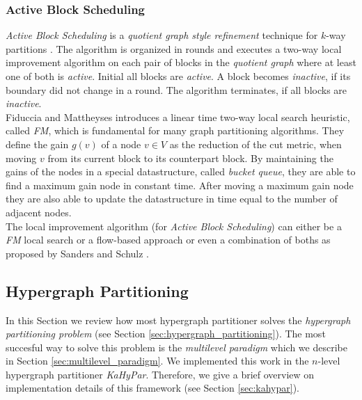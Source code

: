 \subsubsection{Active Block Scheduling}
\label{sec:abs}
\emph{Active Block Scheduling} is a \emph{quotient graph style refinement} technique for
$k$-way partitions \cite{holtgrewe2010engineering,sanders2011engineering}. 
The algorithm is organized in rounds and executes a two-way 
local improvement algorithm on each pair of 
blocks in the \emph{quotient graph} where at least one of both is \emph{active}. 
Initial all blocks are \emph{active}. A block becomes \emph{inactive}, 
if its boundary did not change in a round. The algorithm
terminates, if all blocks are \emph{inactive}. \\
Fiduccia and Mattheyses \cite{fiduccia1988linear} introduces a linear time
two-way local search heuristic, called \emph{FM}, 
which is fundamental for many graph partitioning algorithms.
They define the gain $g(v)$ of a node $v \in V$ as the reduction of the cut metric, when
moving $v$ from its current block to its counterpart block. By maintaining the gains of the
nodes in a special datastructure, called \emph{bucket queue}, they are able to find a maximum
gain node in constant time. After moving a maximum gain node they are also able to update the
datastructure in time equal to the number of adjacent nodes.\\
The local improvement algorithm (for \emph{Active Block Scheduling}) can either 
be a \emph{FM} local search or a flow-based approach or even a combination of 
boths as proposed by Sanders and Schulz \cite{sanders2011engineering}. \\



\subsection{Hypergraph Partitioning}

In this Section we review how most hypergraph partitioner solves the \emph{hypergraph
partitioning problem} (see Section \ref{sec:hypergraph_partitioning}). The most succesful
way to solve this problem is the \emph{multilevel paradigm} \cite{alpert1995recent,
bader2013graph,papa2007hypergraph} which we describe in Section \ref{sec:multilevel_paradigm}.
We implemented this work in the $n$-level hypergraph partitioner \emph{KaHyPar}. Therefore, we
give a brief overview on implementation details of this framework (see Section \ref{sec:kahypar}).

